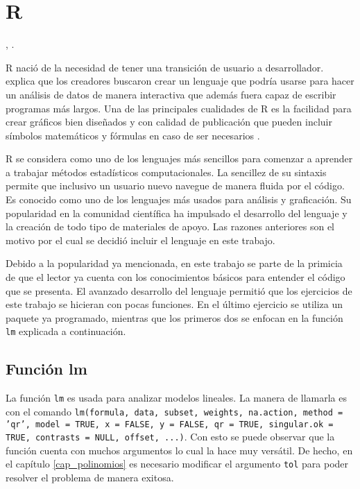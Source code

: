 \chapter{R}

, \cite{laberintos_historiaR}. 

\textsf{R} nació de la necesidad de tener una transición de usuario a desarrollador. \cite{peng_programming} explica que los creadores buscaron crear un lenguaje que podría usarse para hacer un análisis de datos de manera interactiva que además fuera capaz de escribir programas más largos. Una de las principales cualidades de \textsf{R} es la facilidad para crear gráficos bien diseñados y con calidad de publicación que pueden incluir símbolos matemáticos y fórmulas en caso de ser necesarios \cite{pagina_r}. 

\textsf{R} se considera como uno de los lenguajes más sencillos para comenzar a aprender a trabajar métodos estadísticos computacionales. La sencillez de su sintaxis permite que inclusivo un usuario nuevo navegue de manera fluida por el código. Es conocido como uno de los lenguajes más usados para análisis y graficación. Su popularidad en la comunidad científica ha impulsado el desarrollo del lenguaje y la creación de todo tipo de materiales de apoyo. Las razones anteriores son el motivo por el cual se decidió incluir el lenguaje en este trabajo. 

Debido a la popularidad ya mencionada, en este trabajo se parte de la primicia de que el lector ya cuenta con los conocimientos básicos para entender el código que se presenta. El avanzado desarrollo del lenguaje permitió que los ejercicios de este trabajo se hicieran con pocas funciones. En el último ejercicio se utiliza un paquete ya programado, mientras que los primeros dos se enfocan en la función \texttt{lm} explicada a continuación. 

\section{Función lm} \label{explicacion_lm}

La función \texttt{lm} es usada para analizar modelos lineales. La manera de llamarla es con el comando \texttt{lm(formula, data, subset, weights, na.action, method = 'qr', model = TRUE, x = FALSE, y = FALSE, qr = TRUE, singular.ok = TRUE, contrasts = NULL, offset, ...)}. Con esto se puede observar que la función cuenta con muchos argumentos lo cual la hace muy versátil. De hecho, en el capítulo \ref{cap_polinomios} es necesario modificar el argumento \texttt{tol} para poder resolver el problema de manera exitosa. 

